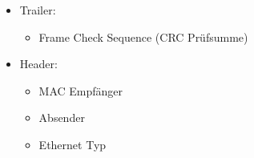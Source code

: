 \begin{itemize}
    \item Trailer:
    \begin{itemize}
        \item Frame Check Sequence (CRC Prüfsumme)
    \end{itemize}
    \item Header:
    \begin{itemize}
        \item MAC Empfänger
        \item Absender
        \item Ethernet Typ
    \end{itemize}
\end{itemize}
